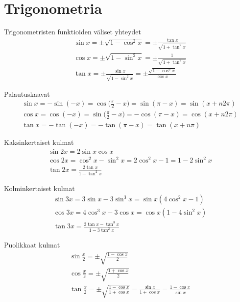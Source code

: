 \clearpage



\section{Trigonometria}

Trigonometristen funktioiden väliset yhteydet \cite[s. 31]{MAOL}
\begin{align*}
& \sin x = \pm \sqrt{1- \cos^2 x} = \pm \frac{\tan x}{\sqrt{1 + \tan^2 x}} \\
& \cos x = \pm \sqrt{1 - \sin^2 x} = \pm \frac{1}{\sqrt{1 + \tan^2 x}} \\
& \tan x = \pm \frac{ \sin x}{\sqrt{1 - \sin^2 x}} = \pm \frac{\sqrt{1 - \cos^2 x}}{\cos x}
\end{align*}

Palautuskaavat \cite[s. 31]{MAOL}
\begin{align*}
& \sin x = - \sin(-x) = \cos \Big( \frac{\pi}{2} - x \Big) = \sin(\pi -x) = \sin(x + n2\pi) \\
& \cos x = \cos(-x) = \sin \Big( \frac{\pi}{2} - x \Big) = -\cos(\pi-x) = \cos(x + n2\pi) \\
& \tan x = - \tan(-x) = -\tan(\pi - x) = \tan(x + n\pi)
\end{align*}

Kaksinkertaiset kulmat \cite[s. 32]{MAOL}
\begin{align*}
& \sin 2x = 2 \sin x \cos x \\
& \cos 2x = \cos^2 x - \sin^2 x = 2 \cos^2 x - 1 = 1 - 2 \sin^2 x \\
& \tan 2x = \frac{2 \tan x}{1 - \tan^2 x}
\end{align*}

Kolminkertaiset kulmat \cite[s. 32]{MAOL}
\begin{align*}
& \sin 3x = 3 \sin x - 3 \sin^3 x = \sin x (4 \cos^2 x - 1) \\
& \cos 3x = 4 \cos^3 x - 3 \cos x = \cos x (1 - 4 \sin^2 x ) \\
& \tan 3x = \frac{3 \tan x - \tan^3 x}{1 - 3 \tan^2 x}
\end{align*}

Puolikkaat kulmat \cite[s. 32]{MAOL}
\begin{align*}
& \sin \frac{x}{2} = \pm \sqrt{\frac{1 - \cos x}{2}} \\
& \cos \frac{x}{2} = \pm \sqrt{\frac{1 + \cos x}{2}} \\
& \tan \frac{x}{2} = \pm \sqrt{\frac{1 - \cos x}{1 + \cos x}} = \frac{\sin x}{1 + \cos x} = \frac{1 - \cos x}{\sin x}
\end{align*}


